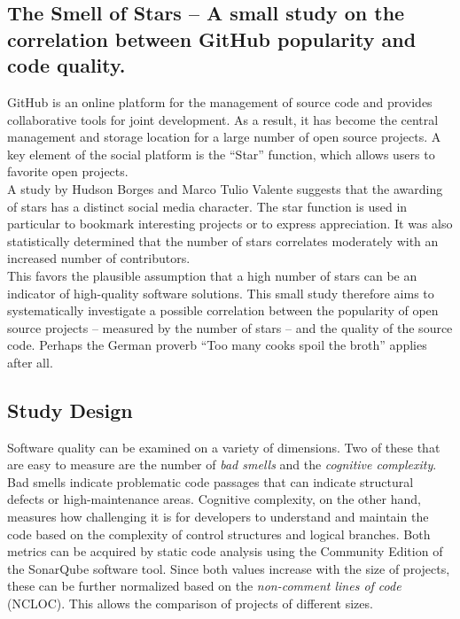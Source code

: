 \documentclass[a4paper, 12pt]{article}
\begin{document}
	
\subsection*{The Smell of Stars -- A small study on the correlation between GitHub popularity and code quality.}

GitHub is an online platform for the management of source code and provides collaborative tools for joint development. As a result, it has become the central management and storage location for a large number of open source projects. A key element of the social platform is the “Star” function, which allows users to favorite open projects.\\

A study by Hudson Borges and Marco Tulio Valente\autocite{Borges2018} suggests that the awarding of stars has a distinct social media character. The star function is used in particular to bookmark interesting projects or to express appreciation. It was also statistically determined that the number of stars correlates moderately with an increased number of contributors.\\

This favors the plausible assumption that a high number of stars can be an indicator of high-quality software solutions. This small study therefore aims to systematically investigate a possible correlation between the popularity of open source projects -- measured by the number of stars -- and the quality of the source code. Perhaps the German proverb “Too many cooks spoil the broth” applies after all.\\
	
	
\subsection*{Study Design}

Software quality can be examined on a variety of dimensions. Two of these that are easy to measure are the number of \textit{bad smells} and the \textit{cognitive complexity}\autocite{Bogner2022}. Bad smells indicate problematic code passages that can indicate structural defects or high-maintenance areas. Cognitive complexity, on the other hand, measures how challenging it is for developers to understand and maintain the code based on the complexity of control structures and logical branches. Both metrics can be acquired by static code analysis using the Community Edition of the SonarQube software tool\autocite{SonarQube}. Since both values increase with the size of projects, these can be further normalized based on the \textit{non-comment lines of code} (NCLOC). This allows the comparison of projects of different sizes.\\
\end{document}
